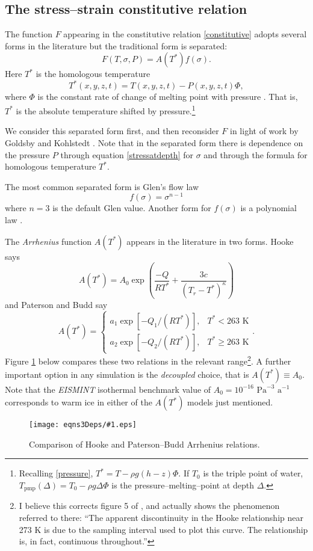 \documentclass{amsart}%
\theoremstyle{plain}
\theoremstyle{definition}
\theoremstyle{remark}
\newcommand{\regfigure}[2]{\texttt{[image: eqns3Deps/\#1.eps]}}
\newcommand{\Tpmp}{T_{\text{pmp}}}
\begin{document}
\subsection{The stress--strain constitutive relation}\label{Fsubsect}  The function $F$ appearing in the constitutive relation \eqref{constitutive} adopts several forms in the literature but the traditional form is separated:
\begin{equation}\label{tradF}
F(T,\sigma,P)=A(T^*) f(\sigma).
\end{equation}
Here $T^*$ is the homologous temperature
    $$T^*(x,y,z,t) = T(x,y,z,t) - P(x,y,z,t) \Phi,$$
where $\Phi$ is the constant rate of change of melting point with pressure \cite{PayneBaldwin}.  That is, $T^*$ is the absolute temperature shifted by pressure.\footnote{Recalling \eqref{pressure}, $T^*=T-\rho g (h-z) \Phi$.  If $T_0$ is the triple point of water, $\Tpmp(\Delta) = T_0 - \rho g \Delta \Phi$ is the pressure--melting--point at depth $\Delta$.}

We consider this separated form first, and then reconsider $F$ in light of work by Goldsby and Kohlstedt \cite{GoldsbyKohlstedt}.  Note that in the separated form there is dependence on the pressure $P$ through equation \eqref{stressatdepth} for $\sigma$ and through the formula for homologous temperature $T^*$.

The most common separated form is Glen's flow law \cite{Glen}
    $$f(\sigma)=\sigma^{n-1}$$
where $n=3$ is the default Glen value.  Another form for $f(\sigma)$ is a polynomial law \cite{Hutter93}.

The \emph{Arrhenius} function $A(T^*)$ appears in the literature in two forms.  Hooke \cite{Hooke} says
    $$A(T^*) = A_0 \exp\left(\frac{-Q}{R T^*} + \frac{3c}{(T_r - T^*)^\kappa}\right)$$
and Paterson and Budd \cite{PatersonBudd} say
\begin{equation}\label{PatBuddArr}
A(T^*) = \begin{cases} a_1 \exp\left[-Q_1/(R T^*)\right], &T^*<263 \text{ K} \\
a_2 \exp\left[-Q_2/(R T^*)\right], &T^*\ge 263 \text{ K} \end{cases}.
\end{equation}
Figure \ref{arrfig} below compares these two relations in the relevant range\footnote{I believe this corrects figure 5 of \cite{PayneBaldwin}, and actually shows the phenomenon referred to there: ``The apparent discontinuity in the Hooke relationship near 273 K is due to the sampling interval used to plot this curve.  The relationship is, in fact, continuous throughout.''}.  A further important option in any simulation is the \emph{decoupled} choice, that is $A(T^*)\equiv A_0$.  Note that the \emph{EISMINT} isothermal benchmark \cite{EISMINT96} value of $A_0=10^{-16}$ $\text{Pa}^{-3}$ $\text{a}^{-1}$ corresponds to warm ice in either of the $A(T^*)$ models just mentioned.
\begin{figure}[ht]
\regfigure{arrfig}{2}
\caption{Comparison of Hooke \cite{Hooke} and Paterson--Budd \cite{PatersonBudd} Arrhenius relations.}
\label{arrfig}
\end{figure}
\end{document}
